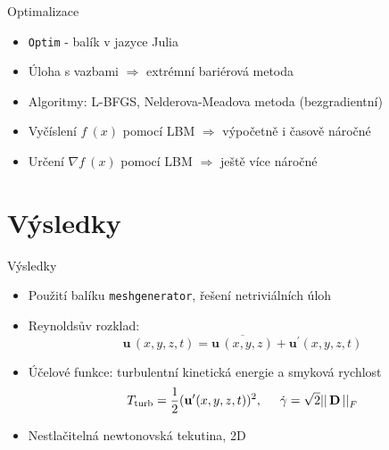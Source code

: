 \documentclass[aspectratio=169,xcolor=dvipsnames]{beamer}
\newcommand{\vect}[1]{\mathbf{#1}}
\begin{document}
\begin{frame}{Optimalizace}
	\begin{itemize}
		\setlength\itemsep{1.8em}
		\item \texttt{Optim} - balík v jazyce Julia 
		\item Úloha s vazbami $\Rightarrow$ extrémní bariérová metoda
		\item Algoritmy: L-BFGS, Nelderova-Meadova metoda (bezgradientní)
		\item Vyčíslení $ f \ (x) $ pomocí LBM $\Rightarrow$ \alert{výpočetně i časově náročné}
		\item Určení $ \nabla f \ (x) $ pomocí LBM $\Rightarrow$ \alert{ještě více náročné}
	\end{itemize}
\end{frame}


\section{Výsledky}
\begin{frame}{Výsledky}
	\begin{itemize}
		\setlength\itemsep{1.4em}
		\item Použití balíku \texttt{meshgenerator}, řešení netriviálních úloh
		\item Reynoldsův rozklad:
				$$ \vect{u} \,(x, y, z, t) = \overline{\vect{u} \,(x, y, z)} + \vect{u}^\prime(x, y, z, t) $$
		\item Účelové funkce: turbulentní kinetická energie a smyková rychlost
				$$ T_{\mathrm{turb}} = \frac{1}{2} (\vect{u}^\prime(x, y, z, t) )^2, \hspace{5mm} \dot{\gamma} = \sqrt{2} || \, \mathbf{D} \, ||^{}_{F}$$
		\item Nestlačitelná newtonovská tekutina, 2D
	\end{itemize}
\end{frame}
\end{document}
